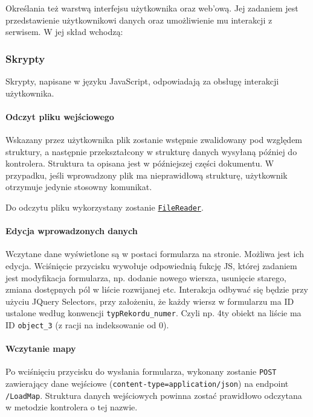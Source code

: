 \documentclass[a4paper, 10pt, titlepage]{article}
\newcommand{\code}[1]{\texttt{#1}}
\begin{document}
Określania też warstwą interfejsu użytkownika oraz web'ową.
Jej zadaniem jest przedstawienie użytkownikowi danych oraz umożliwienie mu interakcji z serwisem. W jej skład wchodzą:

\subsubsection{Skrypty}

Skrypty, napisane w języku JavaScript, odpowiadają za obsługę interakcji użytkownika.

\paragraph{Odczyt pliku wejściowego}

Wskazany przez użytkownika plik zostanie wstępnie zwalidowany pod względem struktury, a następnie przekształcony w strukturę danych wysyłaną później do kontrolera.
Struktura ta opisana jest w późniejszej części dokumentu.
W przypadku, jeśli wprowadzony plik ma nieprawidłową strukturę, użytkownik otrzymuje jedynie stosowny komunikat.

Do odczytu pliku wykorzystany zostanie \href{https://developer.mozilla.org/en-US/docs/Web/API/FileReader}{\code{FileReader}}.

\paragraph{Edycja wprowadzonych danych}

Wczytane dane wyświetlone są w postaci formularza na stronie.
Możliwa jest ich edycja.
Wciśnięcie przycisku wywołuje odpowiednią fukcję JS, której zadaniem jest modyfikacja formularza, np. dodanie nowego wiersza, usunięcie starego, zmiana dostępnych pól w liście rozwijanej etc.
Interakcja odbywać się będzie przy użyciu JQuery Selectors, przy założeniu, że każdy wiersz w formularzu ma ID ustalone według konwencji \code{typRekordu\_numer}.
Czyli np. 4ty obiekt na liście ma ID \code{object\_3} (z racji na indeksowanie od 0).

\paragraph{Wczytanie mapy}

Po wciśnięciu przycisku do wysłania formularza, wykonany zostanie \code{POST} zawierający dane wejściowe (\code{content-type=application/json}) na endpoint \code{/LoadMap}.
Struktura danych wejściowych powinna zostać prawidłowo odczytana w metodzie kontrolera o tej nazwie.
\end{document}
